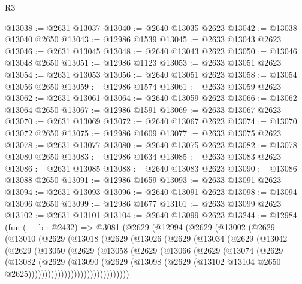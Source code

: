 \begin{lexlean}{R3}
\begin{coremodule}
@13038 := @2631 @13037
@13040 := @2640 @13035 @2623
@13042 := @13038 @13040 @2650
@13043 := @12986 @1539
@13045 := @2633 @13043 @2623
@13046 := @2631 @13045
@13048 := @2640 @13043 @2623
@13050 := @13046 @13048 @2650
@13051 := @12986 @1123
@13053 := @2633 @13051 @2623
@13054 := @2631 @13053
@13056 := @2640 @13051 @2623
@13058 := @13054 @13056 @2650
@13059 := @12986 @1574
@13061 := @2633 @13059 @2623
@13062 := @2631 @13061
@13064 := @2640 @13059 @2623
@13066 := @13062 @13064 @2650
@13067 := @12986 @1591
@13069 := @2633 @13067 @2623
@13070 := @2631 @13069
@13072 := @2640 @13067 @2623
@13074 := @13070 @13072 @2650
@13075 := @12986 @1609
@13077 := @2633 @13075 @2623
@13078 := @2631 @13077
@13080 := @2640 @13075 @2623
@13082 := @13078 @13080 @2650
@13083 := @12986 @1634
@13085 := @2633 @13083 @2623
@13086 := @2631 @13085
@13088 := @2640 @13083 @2623
@13090 := @13086 @13088 @2650
@13091 := @12986 @1659
@13093 := @2633 @13091 @2623
@13094 := @2631 @13093
@13096 := @2640 @13091 @2623
@13098 := @13094 @13096 @2650
@13099 := @12986 @1677
@13101 := @2633 @13099 @2623
@13102 := @2631 @13101
@13104 := @2640 @13099 @2623
@13244 := @12984
    (fun (__b : @2432) =>
    @3081
      (@2629
        (@12994
          (@2629
            (@13002
              (@2629
                (@13010
                  (@2629
                    (@13018
                      (@2629
                        (@13026
                          (@2629
                            (@13034
                              (@2629
                                (@13042
                                  (@2629
                                    (@13050
                                      (@2629
                                        (@13058
                                          (@2629
                                            (@13066
                                              (@2629
                                                (@13074
                                                  (@2629
                                                    (@13082
                                                      (@2629
                                                        (@13090
                                                          (@2629
                                                            (@13098
                                                              (@2629
                                                                (@13102
                                                                  @13104
                                                                  @2650
                                                                  @2625)))))))))))))))))))))))))))))))

\end{coremodule}
\end{lexlean}
